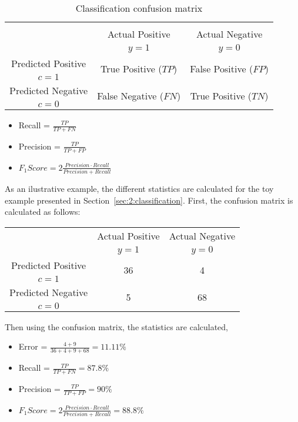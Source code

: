 	\begin{table}[!t]
		\centering
		\footnotesize
    \begin{tabular}{c|c|c}
      \multicolumn{3}{c}{}\\
			\multicolumn{1}{c|}{}  & Actual Positive& Actual Negative \\
			\multicolumn{1}{c|}{} & $y=1$& $y=0$ \\
			\hline
			Predicted Positive 		& \multirow{ 2}{*}{True Positive ($TP$)} & \multirow{ 
			2}{*}{False Positive ($FP$)} \\
			$c=1$ & &\\
			\hline
			Predicted Negative  	& \multirow{ 2}{*}{False Negative ($FN$)} & \multirow{ 
			2}{*}{True Positive ($TN$)} \\
			$c=0$ & &\\
		\end{tabular}
		\caption{Classification confusion matrix}
		\label{tab:2:1}
  \end{table}  

	\begin{itemize}
		\item Recall = $\frac{TP}{TP+FN}$
		\item Precision = $\frac{TP}{TP+FP}$
		\item $F_1Score = 2\frac{Precision \cdot Recall}{Precision + Recall}$
	\end{itemize}

 
  \newpage
  
  As an ilustrative example, the different statistics are calculated for the toy example presented 
  in Section~\ref{sec:2:classification}. First, the confusion matrix is calculated as 
  follows:
  \begin{center}
    \footnotesize
  \begin{tabular}{c|c|c}
    \multicolumn{1}{c|}{}  & Actual Positive& Actual Negative \\
    \multicolumn{1}{c|}{} & $y=1$& $y=0$ \\
    \hline
    Predicted Positive    & \multirow{ 2}{*}{36} & \multirow{ 
    2}{*}{4} \\
    $c=1$ & &\\
    \hline
    Predicted Negative    & \multirow{ 2}{*}{5} & \multirow{ 
    2}{*}{68} \\
    $c=0$ & &\\
  \end{tabular}
  \end{center}
  Then using the confusion matrix, the statistics are calculated,
 	\begin{itemize}
  	\item Error = $\frac{4+9}{36+4+9+68}=11.11\%$
		\item Recall = $\frac{TP}{TP+FN}=87.8\%$
		\item Precision = $\frac{TP}{TP+FP}=90\%$
		\item $F_1Score = 2\frac{Precision \cdot Recall}{Precision + Recall}=88.8\%$
	\end{itemize}
	
